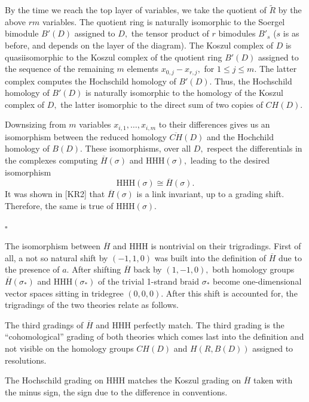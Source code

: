 \documentclass[12pt]{article}
\begin{document}
\vspace{0.1in} 

By the time we reach the top layer of variables, we 
take the quotient of $\widetilde{R}$ by the above 
$rm$ variables. The quotient ring is naturally isomorphic 
to the Soergel bimodule $B'(D)$ assigned to $D,$ the 
tensor product of $r$ bimodules $B'_s$ ($s$ is as before, 
and depends on the layer of the diagram). The Koszul 
complex of $D$ is quasiisomorphic to the Koszul 
complex of the quotient ring $B'(D)$ assigned to the sequence of 
the remaining $m$ elements $x_{0,j}-x_{r,j},$ for $1\le j\le m.$  
The latter complex computes the Hochschild homology 
of $B'(D).$ Thus, the Hochschild homology of $B'(D)$ is 
naturally isomorphic to the homology of the Koszul 
complex of $D,$ the latter isomorphic to the direct sum of 
two copies of $CH(D).$ 

Downsizing from $m$ variables $x_{i,1}, \dots, x_{i,m}$ to 
their differences gives us an isomorphism between the 
reduced homology $\overline{CH}(D)$ and 
the Hochchild homology of $B(D).$ These isomorphisms, 
over all $D,$ respect the differentials in the complexes 
computing $\overline{H}(\sigma)$ and $\mathrm{HHH}(\sigma),$ 
leading to the desired isomorphism 
$$\mathrm{HHH}(\sigma)\cong \overline{H}(\sigma).$$  
It was shown in [KR2] that $\overline{H}(\sigma)$ is a 
link invariant, up to a grading shift. Therefore, the same is 
true of $\mathrm{HHH}(\sigma).$ 

$\square$ 

\vspace{0.15in} 

The isomorphism between $\overline{H}$ and $\mathrm{HHH}$ 
is nontrivial on their trigradings. First of all, a not so natural 
shift by $(-1,1,0)$ was built into the definition of $\overline{H}$ due 
to the presence of $a.$ After shifting $\overline{H}$ back by $(1,-1,0),$ 
both homology groups $\overline{H}(\sigma_{\ast})$ and 
$\mathrm{HHH}(\sigma_{\ast})$ of the trivial 1-strand braid 
$\sigma_{\ast}$ become one-dimensional vector spaces sitting in tridegree 
$(0,0,0).$ After this shift is accounted for, the trigradings of the 
two theories relate as follows. 

The third  gradings of $\overline{H}$ and $\mathrm{HHH}$ perfectly match. 
The third grading is the ``cohomological'' grading of both 
theories which comes last into the definition and not visible 
on the homology groups $CH(D)$ and $H(R,B(D))$ 
assigned to resolutions.

The Hochschild grading on $\mathrm{HHH}$ matches the Koszul 
grading on $\overline{H}$ taken with the minus sign, the sign  
due to the difference in conventions.  
\end{document}
